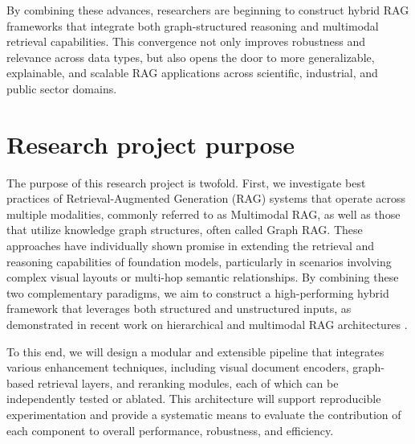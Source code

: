 \documentclass[12pt,twoside]{report}
\begin{document}
By combining these advances, researchers are beginning to construct hybrid RAG frameworks that integrate both graph-structured reasoning and multimodal retrieval capabilities. This convergence not only improves robustness and relevance across data types, but also opens the door to more generalizable, explainable, and scalable RAG applications across scientific, industrial, and public sector domains.

\section{Research project purpose}
The purpose of this research project is twofold. First, we investigate best practices of Retrieval-Augmented Generation (RAG) systems that operate across multiple modalities, commonly referred to as Multimodal RAG, as well as those that utilize knowledge graph structures, often called Graph RAG. These approaches have individually shown promise in extending the retrieval and reasoning capabilities of foundation models, particularly in scenarios involving complex visual layouts or multi-hop semantic relationships. By combining these two complementary paradigms, we aim to construct a high-performing hybrid framework that leverages both structured and unstructured inputs, as demonstrated in recent work on hierarchical and multimodal RAG architectures \cite{HMRAG}. 

To this end, we will design a modular and extensible pipeline that integrates various enhancement techniques, including visual document encoders, graph-based retrieval layers, and reranking modules, each of which can be independently tested or ablated. This architecture will support reproducible experimentation and provide a systematic means to evaluate the contribution of each component to overall performance, robustness, and efficiency.
\end{document}

